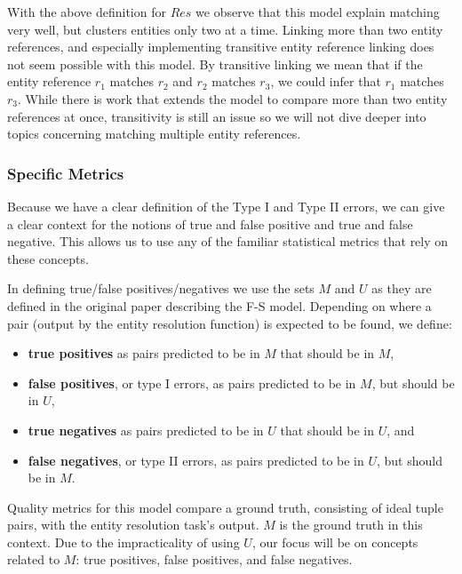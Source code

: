 \documentclass[journal]{IEEEtran}
\begin{document}
    With the above definition for $Res$ we observe that this model explain
    matching very well, but clusters entities only two at a time.
    Linking more than two entity references, and especially implementing
    transitive entity reference linking does not seem possible with this
    model\cite{Tal11}.
    By transitive linking we mean that if the entity reference $r_1$ matches
    $r_2$ and $r_2$ matches $r_3$, we could infer that $r_1$ matches $r_3$.
    While there is work that extends the model to compare more than two entity
    references\cite{Kon19} at once, transitivity is still an issue so we will
    not dive deeper into topics concerning matching multiple entity references.
    
    \subsubsection[fsm-metrics]{Specific Metrics}\label{subsubsec:fsm-metrics}

    Because we have a clear definition of the Type I and Type II errors, we can
    give a clear context for the notions of true and false positive and true and
    false negative.
    This allows us to use any of the familiar statistical metrics that rely on
    these concepts.
    
    In defining true/false positives/negatives we use the sets $M$ and $U$ as
    they are defined in the original paper describing the F-S model.
    Depending on where a pair (output by the entity resolution function) is
    expected to be found, we define:

    \begin{itemize}
        \item \textbf{true positives} as pairs predicted to be in $M$ that
        should be in $M$,
        \item \textbf{false positives}, or type I errors, as pairs predicted to
        be in $M$, but should be in $U$,
        \item \textbf{true negatives} as pairs predicted to be in $U$ that
        should be in $U$, and
        \item \textbf{false negatives}, or type II errors, as pairs predicted to
        be in $U$, but should be in $M$.
    \end{itemize}

    Quality metrics for this model compare a ground truth, consisting of ideal
    tuple pairs, with the entity resolution task's output.
    $M$ is the ground truth in this context.
    Due to the impracticality of using $U$, our focus will be on concepts
    related to $M$: true positives, false positives, and false negatives.
    
\end{document}
